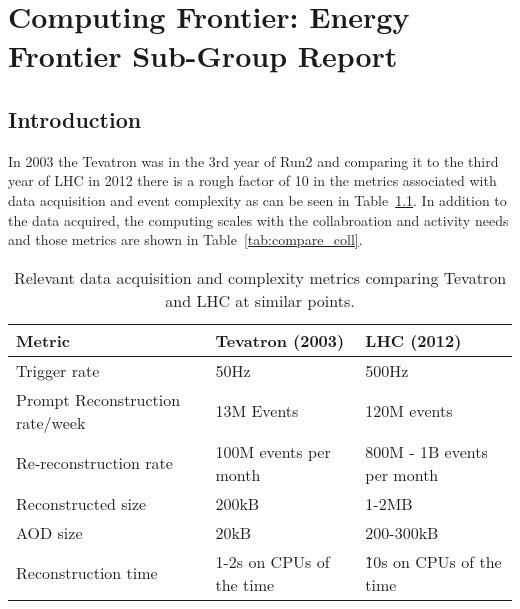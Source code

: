  
\chapter{Computing Frontier: Energy Frontier Sub-Group Report}
\label{chap:E2}


\begin{center}\begin{boldmath}



\end{boldmath}\end{center}


\section{Introduction}
\label{sec:comp-intro}

In 2003 the Tevatron was in the 3rd year of Run2 and comparing it to the third 
year of LHC in 2012 there is a rough factor of 10 in the metrics associated with 
data acquisition and event complexity as can be seen in Table~\ref{tab:compare_daq}. In addition to the data acquired, the computing scales with the collabroation and activity needs and those metrics are shown in Table~\ref{tab:compare_coll}.

\begin{table}[t]
\begin{center}
\begin{tabular}{lll}
Metric & Tevatron (2003) & LHC (2012) \\ \hline
Trigger rate & 50Hz & 500Hz \\
Prompt Reconstruction rate/week & 13M Events & 120M events \\
Re-reconstruction rate & 100M events per month & 800M - 1B events per month \\
Reconstructed size & 200kB & 1-2MB \\
AOD size & 20kB & 200-300kB \\
Reconstruction time & 1-2s on CPUs of the time & \~ 10s on CPUs of the time \\ \hline
\end{tabular}
\caption{Relevant data acquisition and complexity metrics comparing Tevatron and LHC at similar points.}
\label{tab:compare_daq}
\end{center}
\end{table}


